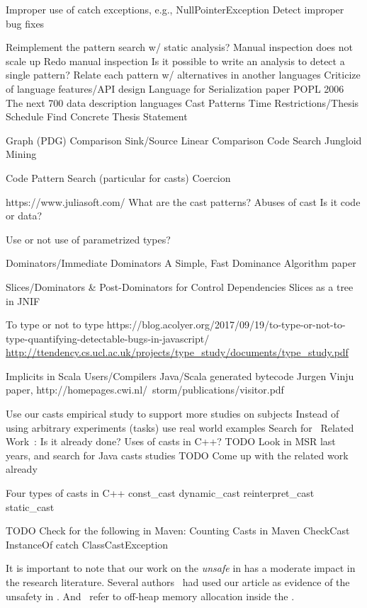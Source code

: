 Improper use of catch exceptions, e.g., NullPointerException
Detect improper bug fixes


Reimplement the pattern search w/ static analysis?
Manual inspection does not scale up
Redo manual inspection
Is it possible to write an analysis to detect a single pattern?
Relate each pattern w/ alternatives in another languages
Criticize of language features/API design
Language for Serialization paper POPL 2006
The next 700 data description languages
Cast Patterns
Time Restrictions/Thesis Schedule
Find Concrete Thesis Statement


Graph (PDG) Comparison
Sink/Source
Linear Comparison
Code Search
Jungloid Mining

Code Pattern Search (particular for casts)
Coercion

https://www.juliasoft.com/
What are the cast patterns?
Abuses of cast
Is it code or data?

Use or not use of parametrized types?

Dominators/Immediate Dominators
A Simple, Fast Dominance Algorithm paper



Slices/Dominators \& Post-Dominators for Control Dependencies
Slices as a tree in JNIF

To type or not to type
https://blog.acolyer.org/2017/09/19/to-type-or-not-to-type-quantifying-detectable-bugs-in-javascript/
\url{http://ttendency.cs.ucl.ac.uk/projects/type_study/documents/type_study.pdf}

Implicits in Scala
Users/Compilers Java/Scala generated bytecode
Jurgen Vinju paper, http://homepages.cwi.nl/~storm/publications/visitor.pdf

Use our casts empirical study to support more studies on subjects
Instead of using arbitrary experiments (tasks) use real world examples
Search for ~Related Work~: Is it already done?
Uses of casts in C++?
TODO Look in MSR last years, and search for Java casts studies 
TODO Come up with the related work already

Four types of casts in C++
const\_cast
dynamic\_cast
reinterpret\_cast
static\_cast

TODO Check for the following in Maven:
Counting Casts in Maven
CheckCast
InstanceOf
catch ClassCastException


It is important to note that our work on the \emph{unsafe} \api{} in \java{} has a moderate impact in the research literature.
Several authors~
\cite{staicu_understanding_2017,jiang_unsupervised_2017,zhang_accepting_2016,saied_cooperative_2016,hora_when_2016,li_accessing_2016,holzinger_-depth_2016} had used our article as evidence of the unsafety in \java{}.
And~\cite{bruno_ng2c:_2017} refer to off-heap memory allocation inside the \jvm{}.

